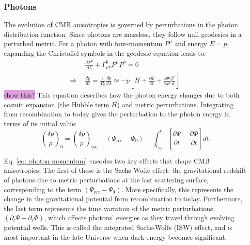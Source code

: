\documentclass{aa}
\numberwithin{equation}{section}
\numberwithin{table}{section}
\numberwithin{figure}{section}
\begin{document}
\subsubsection{Photons}\label{subsubsec: III theory photons}
The evolution of CMB anisotropies is governed by perturbations in the photon distribution function. Since photons are massless, they follow null geodesics in a perturbed metric. For a photon with four-momentum $P^\mu$ and energy $E=p$, expanding the Christoffel symbols in the geodesic equation leads to: 
\begin{align}
&\frac{dP^0}{d\lambda} + \Gamma^0_{\mu\nu} P^\mu P^\nu = 0 \\
\Rightarrow\hspace{5pt} &\frac{dp}{dt} = \frac{1}{P_0}\frac{dp}{d\lambda} \simeq -p\left[H + \frac{\partial \Phi}{\partial t} + \frac{\partial \Psi}{\partial x^{i}}\frac{\hat{p}^{i}}{a}\right].
\end{align}
\colorbox{Plum}{show this?} This equation describes how the photon energy changes due to both cosmic expansion (the Hubble term $H$) and metric perturbations. Integrating from recombination to today gives the perturbation to the photon energy in terms of its initial value: 
\begin{equation}
\left(\frac{\delta p}{p}\right)_0 = \left(\frac{\delta p}{p}\right)_{\text{rec}} + \left(\Psi_{\text{rec}} - \Psi_0\right) + \int_{t_{\text{rec}}}^{t_0} \left[\frac{\partial\Psi}{\partial t} - \frac{\partial \Phi}{\partial t} \right] dt. \label{eq: photon momentum}
\end{equation}


Eq. \eqref{eq: photon momentum} encodes two key effects that shape CMB anisotropies. The first of these is the Sachs-Wolfe effect: the gravitational redshift of photons due to metric perturbations at the last scattering surface, corresponding to the term $(\Psi_{\text{rec}} - \Psi_0)$. More specifically, this represents the change in the gravitational potential from recombination to today. Furthermore, the last term represents the time variation of the metric perturbations $(\partial_t \Psi - \partial_t \Phi)$, which affects photons' energies as they travel through evolving potential wells. This is called the integrated Sachs-Wolfe (ISW) effect, and is most important in the late Universe when dark energy becomes significant. 
\end{document}
